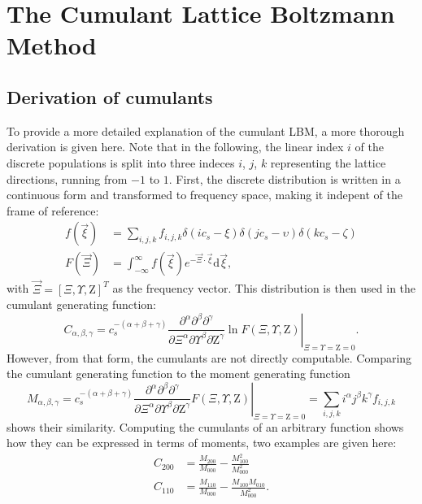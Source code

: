 \chapter{The Cumulant Lattice Boltzmann Method}
\label{app:cumulant}
\section{Derivation of cumulants}
To provide a more detailed explanation of the cumulant LBM, a more thorough derivation is given here. Note that in the following, the linear index $i$ of the discrete populations is split into three indeces $i$, $j$, $k$ representing the lattice directions, running from $-1$ to $1$. First, the discrete distribution is written in a continuous form and transformed to frequency space, making it indepent of the frame of reference:
\begin{align}
f(\vec{\xi}) &= \sum_{i,j,k} f_{i,j,k} \delta(ic_s - \xi) \delta(jc_s - \upsilon) \delta(kc_s - \zeta) \label{eq:contin}\\
F(\vec{\Xi}) &= \int_{-\infty}^{\infty}f(\vec{\xi})e^{-\vec{\Xi} \cdot \vec{\xi}} \mathrm{d}\vec{\xi}, \label{eq:cum_laplace}
\end{align}
with $\vec{\Xi} = [\Xi, \Upsilon, \mathrm{Z}]^T$ as the frequency vector. This distribution is then used in the cumulant generating function: 
\begin{equation}
	C_{\alpha,\beta,\gamma} = c_s^{-(\alpha+\beta+\gamma)} \left. \frac{\partial^\alpha \partial^\beta \partial^\gamma}{\partial \Xi^\alpha \partial \Upsilon^\beta \partial \mathrm{Z}^\gamma} \ln F(\Xi, \Upsilon, \mathrm{Z})\right|_{\Xi=\Upsilon=\mathrm{Z}=0}. \label{eq:cum}
\end{equation} However, from that form, the cumulants are not directly computable. Comparing the cumulant generating function to the moment generating function 
\begin{equation}
	M_{\alpha, \beta, \gamma} = c_s^{-(\alpha+\beta+\gamma)} \left. \frac{\partial^\alpha \partial^\beta \partial^\gamma}{\partial \Xi^\alpha \partial \Upsilon^\beta \partial \mathrm{Z}^\gamma} F(\Xi, \Upsilon, \mathrm{Z}) \right|_{\Xi=\Upsilon=\mathrm{Z}=0} = \sum_{i,j,k} i^\alpha j^\beta k^\gamma f_{i,j,k} \label{eq:moments}
\end{equation} shows their similarity. Computing the cumulants of an arbitrary function shows how they can be expressed in terms of moments, two examples are given here:
\begin{align}
	C_{200} &= \frac{M_{200}}{M_{000}} - \frac{M_{100}^2}{M_{000}^2} \label{eq:c_200}\\
	C_{110} &= \frac{M_{110}}{M_{000}} - \frac{M_{100} M_{010}}{M_{000}^2}. \label{eq:c_110}
\end{align}
